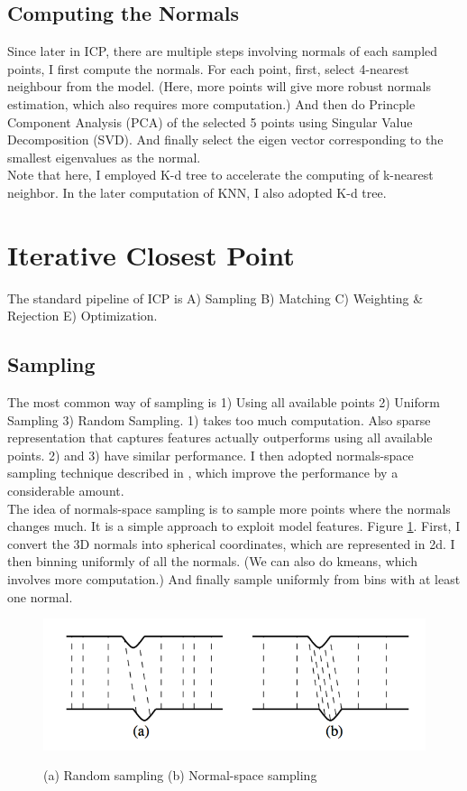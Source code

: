 \documentclass[letterpaper, 10 pt, conference]{ieeeconf}  %
\begin{document}
\subsection{Computing the Normals}
Since later in ICP, there are multiple steps involving normals of each sampled points, I first compute the normals. For each point, first, select 4-nearest neighbour from the model. (Here, more points will give more robust normals estimation, which also requires more computation.) And then do Princple Component Analysis (PCA) of the selected 5 points using Singular Value Decomposition (SVD). And finally select the eigen vector corresponding to the smallest eigenvalues as the normal.\\
Note that here, I employed K-d tree to accelerate the computing of k-nearest neighbor. In the later computation of KNN, I also adopted K-d tree.\\
\section{Iterative Closest Point}
The standard pipeline of ICP is A) Sampling B) Matching C) Weighting & Rejection E) Optimization. 
\subsection{Sampling}
The most common way of sampling is 1) Using all available points 2) Uniform Sampling 3) Random Sampling. 1) takes too much computation. Also sparse representation that captures features actually outperforms using all available points. 2) and 3) have similar performance. I then adopted normals-space sampling technique described in \cite{c1}, which improve the performance by a considerable amount. \\
The idea of normals-space sampling is to sample more points where the normals changes much. It is a simple approach to exploit model features. Figure \ref{fig:nspace}. First, I convert the 3D normals into spherical coordinates, which are represented in 2d. I then binning uniformly of all the normals. (We can also do kmeans, which involves more computation.) And finally sample uniformly from bins with at least one normal.\\
\begin{figure}
\centering
\includegraphics[width=\columnwidth]{normalspace.png}\\
\caption{(a) Random sampling (b) Normal-space sampling}
\label{fig:nspace}
\end{figure}
\end{document}
